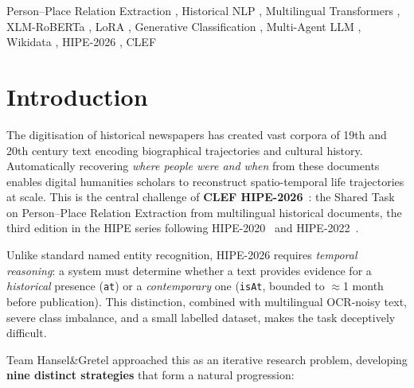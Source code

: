 \documentclass{ceurart}
\begin{document}
\begin{keywords}
  Person--Place Relation Extraction \sep
  Historical NLP \sep
  Multilingual Transformers \sep
  XLM-RoBERTa \sep
  LoRA \sep
  Generative Classification \sep
  Multi-Agent LLM \sep
  Wikidata \sep
  HIPE-2026 \sep
  CLEF
\end{keywords}

\maketitle

\section{Introduction}

The digitisation of historical newspapers has created vast corpora of 19th and 20th century text encoding biographical trajectories and cultural history. Automatically recovering \emph{where people were and when} from these documents enables digital humanities scholars to reconstruct spatio-temporal life trajectories at scale. This is the central challenge of \textbf{CLEF HIPE-2026}~\cite{hipe2026guidelines,opitz_extended_2026}: the Shared Task on Person--Place Relation Extraction from multilingual historical documents, the third edition in the HIPE series following HIPE-2020~\cite{hipe2020} and HIPE-2022~\cite{hipe2022}.

Unlike standard named entity recognition, HIPE-2026 requires \emph{temporal reasoning}: a system must determine whether a text provides evidence for a \emph{historical} presence (\texttt{at}) or a \emph{contemporary} one (\texttt{isAt}, bounded to $\approx$1 month before publication). This distinction, combined with multilingual OCR-noisy text, severe class imbalance, and a small labelled dataset, makes the task deceptively difficult.

Team Hansel\&Gretel approached this as an iterative research problem, developing \textbf{nine distinct strategies} that form a natural progression:
\end{document}
